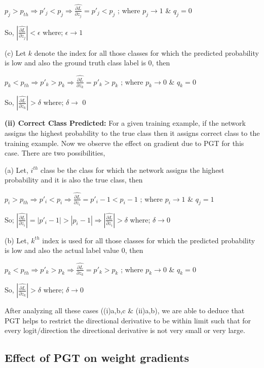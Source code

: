 \documentclass[times,sort&compress]{elsarticle}
\begin{document}
$p_j > p_{th} \Rightarrow p'_j < p_j \Rightarrow \widehat{\frac{\partial L}{\partial
z_j}} = p'_j <  p_j$ ; where $p_j\rightarrow 1$ \& $q_j = 0$

So, $|\widehat{\frac{\partial L}{\partial z_j}}| <\epsilon$ where; $\epsilon\rightarrow
1$



(c) Let $k$ denote the index for all those classes for which the predicted probability
is low and also the ground truth class label is $0$, then

$p_k < p_{th} \Rightarrow p'_k > p_k \Rightarrow \widehat{\frac{\partial L}{\partial
z_k}} = p'_k >  p_k$ ; where $p_k\rightarrow 0$ \& $q_k = 0$

So, $|\widehat{\frac{\partial L}{\partial z_k}}| >\delta$ where; $\delta\rightarrow$ 0

\textbf{(ii) Correct Class Predicted:}
For a given training example, if the network assigns the highest probability to the true
class then it assigns correct class to the training example. Now we observe the effect
on gradient due to PGT for this case. There are two possibilities,

(a) Let, $i^{th}$ class be the class for which the network assigns the highest
probability and it is also the true class, then

$p_i > p_{th} \Rightarrow p'_i < p_i \Rightarrow \widehat{\frac{\partial L}{\partial
z_i}} = p'_i -1 <  p_i -1 $ ; where $p_i\rightarrow 1$ \& $q_j = 1$

So; $|\widehat{\frac{\partial L}{\partial z_i}}| = |p'_i -1| >  |p_i -1|  \Rightarrow
|\widehat{\frac{\partial L}{\partial z_i}}| >\delta $ where; $\delta\rightarrow 0$

(b) Let, $k^{th}$ index is used for all those classes for which the predicted
probability is low and also the actual label value $0$, then

$p_k < p_{th} \Rightarrow p'_k > p_k \Rightarrow \widehat{\frac{\partial L}{\partial
z_k}} = p'_k >  p_k$ ; where $p_k\rightarrow 0$ \& $q_k = 0$

So, $|\widehat{\frac{\partial L}{\partial z_k}}| >\delta$ where; $\delta\rightarrow 0$

After analyzing all these cases ((i)a,b,c \& (ii)a,b), we are able to deduce that PGT
helps to restrict the directional derivative to be within limit such that for every
logit/direction the directional derivative is not very small or very large. 

\subsection{Effect of PGT on weight gradients}
\label{sec:pgt_weight_gradients}
\end{document}
